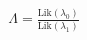 \documentclass[preview]{standalone}
\begin{document}
\begin{align*}
\Lambda = \frac{\text{Lik}(\lambda_0)}{\text{Lik}(\lambda_1)}
\end{align*}
\end{document}
